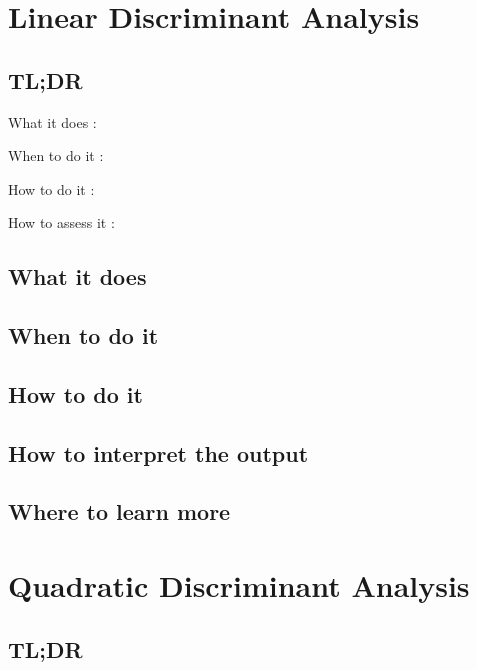 \documentclass[
]{book}
\begin{document}
\hypertarget{linear-discriminant-analysis}{%
\chapter{Linear Discriminant Analysis}\label{linear-discriminant-analysis}}

\hypertarget{tldr-4}{%
\section{TL;DR}\label{tldr-4}}

What it does
:

When to do it
:

How to do it
:

How to assess it
:

\hypertarget{what-it-does-4}{%
\section{What it does}\label{what-it-does-4}}

\hypertarget{when-to-do-it-4}{%
\section{When to do it}\label{when-to-do-it-4}}

\hypertarget{how-to-do-it-4}{%
\section{How to do it}\label{how-to-do-it-4}}

\hypertarget{how-to-interpret-the-output-4}{%
\section{How to interpret the output}\label{how-to-interpret-the-output-4}}

\hypertarget{where-to-learn-more-4}{%
\section{Where to learn more}\label{where-to-learn-more-4}}

\hypertarget{quadratic-discriminant-analysis}{%
\chapter{Quadratic Discriminant Analysis}\label{quadratic-discriminant-analysis}}

\hypertarget{tldr-5}{%
\section{TL;DR}\label{tldr-5}}
\end{document}
